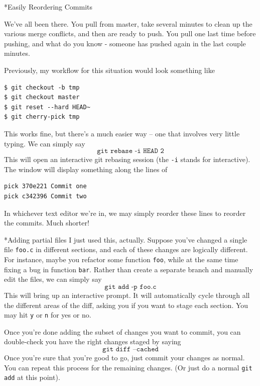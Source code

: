 \documentclass{amsart}
\makeatletter
\renewcommand\subsection{\@startsection{subsection}{2}%
  \z@{-.5\linespacing\@plus-.7\linespacing}{.5\linespacing}%
  {\normalfont\scshape}}
\makeatother
\begin{document}
\subsection*{Easily Reordering Commits}

We've all been there. You pull from master, take several minutes to
clean up the various merge conflicts, and then are ready to push. You
pull one last time before pushing, and what do you know - someone has
pushed again in the last couple minutes.

Previously, my workflow for this situation would look something like
\begin{verbatim}
$ git checkout -b tmp
$ git checkout master
$ git reset --hard HEAD~
$ git cherry-pick tmp
\end{verbatim}

This works fine, but there’s a much easier way -- one that involves
very little typing. We can simply say
\[
  \texttt{git rebase -i HEAD~2}
\]
This will open an interactive git rebasing session (the \texttt{-i}
stands for interactive). The window will display something along the
lines of
\begin{verbatim}
pick 370e221 Commit one
pick c342396 Commit two
\end{verbatim}
In whichever text editor we’re in, we may simply reorder these lines
to reorder the commits. Much shorter!

\subsection*{Adding partial files}
I just used this, actually. Suppose you’ve changed a single file
\texttt{foo.c} in different sections, and each of these changes are
logically different. For instance, maybe you refactor some function
\texttt{foo}, while at the same time fixing a bug in function
\texttt{bar}. Rather than create a separate branch and manually edit
the files, we can simply say
\[
  \texttt{git add -p foo.c}
\]
This will bring up an interactive prompt. It will automatically cycle
through all the different areas of the diff, asking you if you want to
stage each section. You may hit \texttt{y} or \texttt{n} for yes or
no.

Once you’re done adding the subset of changes you want to commit, you
can double-check you have the right changes staged by saying
\[
  \texttt{git diff --cached}
\]
Once you’re sure that you’re good to go, just commit your changes as
normal. You can repeat this process for the remaining changes. (Or
just do a normal \texttt{git add} at this point).
\end{document}
